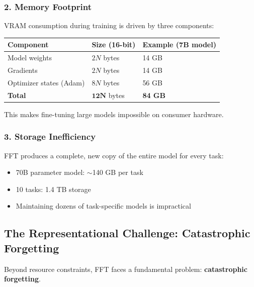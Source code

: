 \documentclass{article}
\begin{document}
\subsubsection{2. Memory Footprint}

VRAM consumption during training is driven by three components:

\begin{center}
\begin{tabular}{lll}
\toprule
\textbf{Component} & \textbf{Size (16-bit)} & \textbf{Example (7B model)} \\
\midrule
Model weights & $2N$ bytes & 14 GB \\
Gradients & $2N$ bytes & 14 GB \\
Optimizer states (Adam) & $8N$ bytes & 56 GB \\
\midrule
\textbf{Total} & $\mathbf{12N}$ bytes & \textbf{84 GB} \\
\bottomrule
\end{tabular}
\end{center}

This makes fine-tuning large models impossible on consumer hardware.

\subsubsection{3. Storage Inefficiency}

FFT produces a complete, new copy of the entire model for every task:

\begin{itemize}
\item 70B parameter model: $\sim$140 GB per task
\item 10 tasks: 1.4 TB storage
\item Maintaining dozens of task-specific models is impractical
\end{itemize}

\begin{center}
\end{center}

\subsection{The Representational Challenge: Catastrophic Forgetting}

Beyond resource constraints, FFT faces a fundamental problem: \textbf{catastrophic forgetting}.
\end{document}
